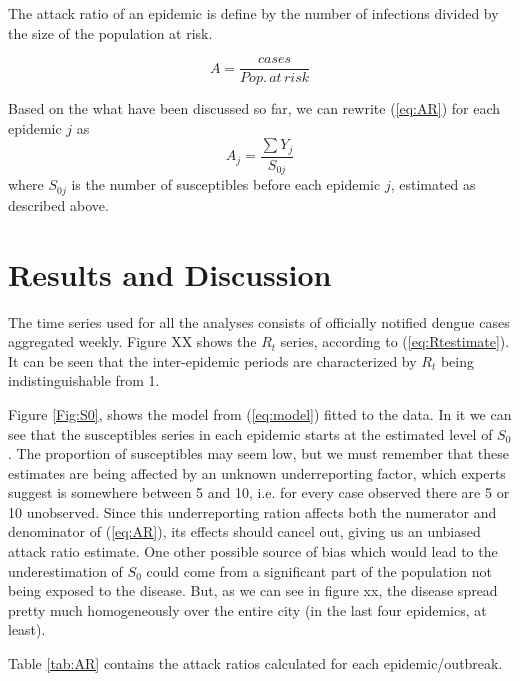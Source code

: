 The attack ratio of an epidemic is define by the number of infections divided 
by the size of the population at risk.

\begin{equation}
\label{eq:AR}
A=\frac{cases}{Pop.\, at\, risk} 
\end{equation}

Based on the what have been discussed so far, we can rewrite (\ref{eq:AR}) for 
each epidemic $j$ as
\begin{equation}
\label{eq:AR2}
 A_{j}=\frac{\sum Y_j}{S_{0j}}
\end{equation}
where $S_{0j}$ is the number of susceptibles before each epidemic $j$, 
estimated as described above.

\section*{Results and Discussion}
 
The time series used for all the analyses consists of officially notified 
dengue cases aggregated weekly. 
Figure XX  shows the $R_t$ series, according to 
(\ref{eq:Rtestimate}). 
It can be seen that the inter-epidemic periods are characterized by $R_t$ being 
indistinguishable from 1.

Figure \ref{Fig:S0}, shows the model from (\ref{eq:model}) fitted to the data. 
In it we can see that the susceptibles series in each epidemic starts at the 
estimated level of $S_0$. The proportion of susceptibles may seem low, but we 
must remember that these estimates are being affected by an unknown 
underreporting factor, which experts suggest is somewhere between 5 and 10, 
i.e. for every case observed there are 5 or 10 unobserved. Since this 
underreporting ration affects both the numerator and denominator of 
(\ref{eq:AR}), its effects should cancel out, giving us an unbiased attack ratio 
estimate. One other possible source of bias which would lead to the 
underestimation of $S_0$ could come from a significant part of the population 
not being exposed to the disease. But, as we can see in figure xx, the disease spread pretty much homogeneously over 
the entire city (in the last four epidemics, at least). 

Table \ref{tab:AR} contains the attack ratios calculated for each 
epidemic/outbreak.
